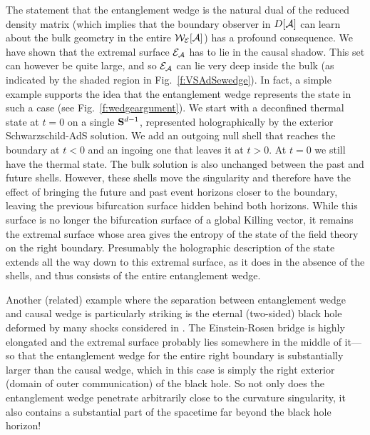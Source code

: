 \documentclass[12pt]{article}
\def\regA{{\cal A}}
\def\domdA{D[\regA]}
\def\extr{{\cal E}_\regA}
\def\EWA{{\cal W}_{\cal E}[\regA]}
\begin{document}
The statement that the entanglement wedge is the natural dual of the reduced density matrix (which implies that the boundary observer in $\domdA$ can learn about the bulk geometry in the entire $\EWA$) has a profound consequence. We have shown that the extremal surface $\extr$ has to lie in the causal shadow.  This set can however be quite large, and so $\extr$ can lie very deep inside the bulk (as indicated by the shaded region in Fig.~\ref{f:VSAdSewedge}). In fact, a simple example supports the idea that the entanglement wedge represents the state in such a case (see Fig.~\ref{f:wedgeargument}). We start with a deconfined thermal state at $t=0$ on a single ${\bf S}^{d-1}$, represented holographically by the exterior Schwarzschild-AdS solution. We add an outgoing null shell that reaches the boundary at $t<0$ and an ingoing one that leaves it at $t>0$. At $t=0$ we still have the thermal state. The bulk solution is also unchanged between the past and future shells. However, these shells move the singularity and therefore have the effect of bringing the future and past event horizons closer to the boundary, leaving the previous bifurcation surface hidden behind both horizons. While this surface is no longer the bifurcation surface of a global Killing vector, it remains the extremal surface whose area gives the entropy of the state of the field theory on the right boundary. Presumably the holographic description of the state extends all the way down to this extremal surface, as it does in the absence of the shells, and thus consists of the entire entanglement wedge.

Another (related) example where the separation between entanglement wedge and causal wedge is particularly striking is the eternal (two-sided) black hole deformed by many shocks considered in  \cite{Shenker:2013pqa,Shenker:2013yza}.  The Einstein-Rosen bridge is highly elongated and the extremal surface probably lies somewhere in the middle of it---so that the entanglement wedge for the entire right boundary is substantially larger than the causal wedge, which in this case is simply the right exterior (domain of outer communication) of the black hole.  So not only does the entanglement wedge penetrate arbitrarily close to the curvature singularity, it also contains a substantial part of the spacetime far beyond the black hole horizon!  




\acknowledgments 
\end{document}
